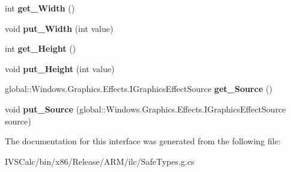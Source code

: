 \begin{DoxyCompactItemize}
int {\bfseries get\+\_\+\+Width} ()
\item 
\mbox{\label{interface_microsoft_1_1_graphics_1_1_canvas_1_1_effects_1_1_i_morphology_effect_ac8928007cf4daceb6edf45df25104160}} 
void {\bfseries put\+\_\+\+Width} (int value)
\item 
\mbox{\label{interface_microsoft_1_1_graphics_1_1_canvas_1_1_effects_1_1_i_morphology_effect_a894c0a79c2bf5a0314930c5c502a7662}} 
int {\bfseries get\+\_\+\+Height} ()
\item 
\mbox{\label{interface_microsoft_1_1_graphics_1_1_canvas_1_1_effects_1_1_i_morphology_effect_aefc8baeb4576bca214b2862f5b188ff8}} 
void {\bfseries put\+\_\+\+Height} (int value)
\item 
\mbox{\label{interface_microsoft_1_1_graphics_1_1_canvas_1_1_effects_1_1_i_morphology_effect_ac0ce4230c50de3053b0200c3868607d6}} 
global\+::\+Windows.\+Graphics.\+Effects.\+I\+Graphics\+Effect\+Source {\bfseries get\+\_\+\+Source} ()
\item 
\mbox{\label{interface_microsoft_1_1_graphics_1_1_canvas_1_1_effects_1_1_i_morphology_effect_a6aba3568850c2df11ccf1005f5ecfbca}} 
void {\bfseries put\+\_\+\+Source} (global\+::\+Windows.\+Graphics.\+Effects.\+I\+Graphics\+Effect\+Source source)
\end{DoxyCompactItemize}


The documentation for this interface was generated from the following file\+:\begin{DoxyCompactItemize}
\item 
I\+V\+S\+Calc/bin/x86/\+Release/\+A\+R\+M/ilc/Safe\+Types.\+g.\+cs\end{DoxyCompactItemize}
